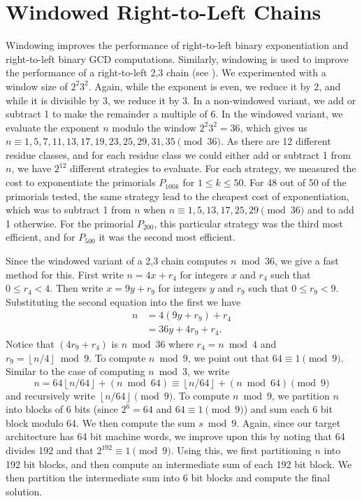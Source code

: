 \documentclass{ucalgthes1}
\theoremstyle{definition}
\newcommand{\floor}[1]{\left\lfloor #1 \right\rfloor}
\begin{document}
\section{Windowed Right-to-Left Chains}

Windowing improves the performance of right-to-left binary exponentiation and right-to-left binary GCD computations.  Similarly, windowing is used to improve the performance of a right-to-left 2,3 chain (see \cite{Doche2006}).  We experimented with a window size of $2^2 3^2$.  Again, while the exponent is even, we reduce it by 2, and while it is divisible by 3, we reduce it by 3.  In a non-windowed variant, we add or subtract 1 to make the remainder a multiple of 6.  In the windowed variant, we evaluate the exponent $n$ modulo the window $2^2 3^2 = 36$, which gives us $n \equiv 1, 5, 7, 11, 13, 17, 19, 23, 25, 29, 31, 35 \pmod {36}$.  As there are 12 different residue classes, and for each residue class we could either add or subtract 1 from $n$, we have $2^{12}$ different strategies to evaluate.  For each strategy, we measured the cost to exponentiate the primorials $P_{100k}$ for $1 \le k \le 50$.  For 48 out of 50 of the primorials tested, the same strategy lead to the cheapest cost of exponentiation, which was to subtract 1 from $n$ when $n \equiv 1, 5, 13, 17, 25, 29 \pmod{36}$ and to add 1 otherwise.  For the primorial $P_{200}$, this particular strategy was the third most efficient, and for $P_{500}$ it was the second most efficient.

Since the windowed variant of a 2,3 chain computes $n \bmod 36$, we give a fast method for this.  First write $n = 4x + r_4$ for integers $x$ and $r_4$ such that $0 \le r_4 < 4$.  Then write $x = 9y + r_9$ for integers $y$ and $r_9$ such that $0 \le r_9 < 9$.  Substituting the second equation into the first we have
\begin{align*}
	n &= 4(9y + r_9) + r_4 \\
	  &= 36y + 4r_9 + r_4.
\end{align*}
Notice that $(4r_9 + r_4)$ is $n \bmod {36}$ where $r_4 = n \bmod 4$ and $r_9 = \floor{n/4} \bmod 9$. To compute $n \bmod 9$, we point out that $64 \equiv 1 \pmod 9$.  Similar to the case of computing $n \bmod 3$, we write
\[
	n = 64 \floor{n/64} + (n \bmod 64) \equiv \floor{n/64} + (n \bmod 64) \pmod 9
\]
and recursively write $\floor{n/64} \pmod 9$.  To compute $n \bmod 9$, we partition $n$ into blocks of 6 bits (since $2^6 = 64$ and $64 \equiv 1 \pmod 9$) and sum each 6 bit block modulo 64.  We then compute the sum $s \bmod 9$.  Again, since our target architecture has 64 bit machine words, we improve upon this by noting that 64 divides 192 and that $2^{192} \equiv 1 \pmod 9$.  Using this, we first partitioning $n$ into 192 bit blocks, and then compute an intermediate sum of each 192 bit block.  We then partition the intermediate sum into 6 bit blocks and compute the final solution.
\end{document}
